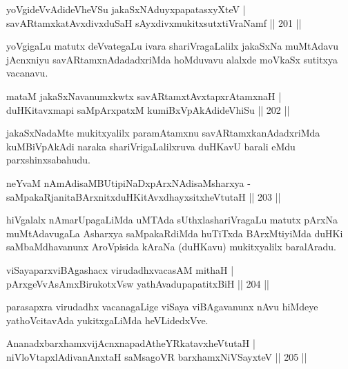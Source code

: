 \begin{shl}
yoVgideVvAdideVheVSu jakaSxNAduyxpapatasxyXteV |\\
savARtamxkatAvxdivxduSaH sAyxdivxmukitxsutxtiVraNamf \hfill || 201 ||
\end{shl}

\begin{artha}%
yoVgigaLu matutx deVvategaLu ivara shariVragaLalilx jakaSxNa muMtAdavu jAcnxniyu savARtamxnAdadadxriMda hoMduvavu alalxde moVkaSx sutitxya vacanavu.
\end{artha}

\begin{shl}
mataM jakaSxNavanumxkwtx savARtamxtAvxtapxrAtamxnaH |\\
duHKitavxmapi saMpArxpatxM kumiBxVpAkAdideVhiSu \hfill || 202 ||
\end{shl}

\begin{artha}
jakaSxNadaMte mukitxyalilx paramAtamxnu savARtamxkanAdadxriMda kuMBiVpAkAdi naraka shariVrigaLalilxruva duHKavU barali eMdu parxshinxsabahudu.
\end{artha}


\begin{shl}
neYvaM nAmAdisaMBUtipiNaDxpArxNAdisaMsharxya -\\
saMpakaRjanitaBArxnitxduHKitAvxdhayxsitxheVtutaH \hfill || 203 ||
\end{shl}

\begin{artha}
hiVgalalx nAmarUpagaLiMda uMTAda sUthxlashariVragaLu matutx pArxNa muMtAdavugaLa Asharxya saMpakaRdiMda huTiTxda BArxMtiyiMda duHKi saMbaMdhavanunx AroVpisida kAraNa (duHKavu) mukitxyalilx baralAradu.
\end{artha}

\begin{shl}
viSayaparxviBAgashacx virudadhxvacasAM mithaH |\\
pArxgeVvAsAmxBirukotxV\s sw yathAvadupapatitxBiH \hfill || 204 ||
\end{shl}

\begin{artha}
parasapxra virudadhx vacanagaLige viSaya viBAgavanunx nAvu hiMdeye yathoVcitavAda yukitxgaLiMda heVLidedxVve.
\end{artha}

\begin{shl}
AnanadxbarxhamxvijAcnxnapadAtheYRkatavxheVtutaH |\\
niVloVtapxlAdivanAnxtaH saMsagoVR barxhamxNiVSayxteV \hfill || 205 ||
\end{shl}

